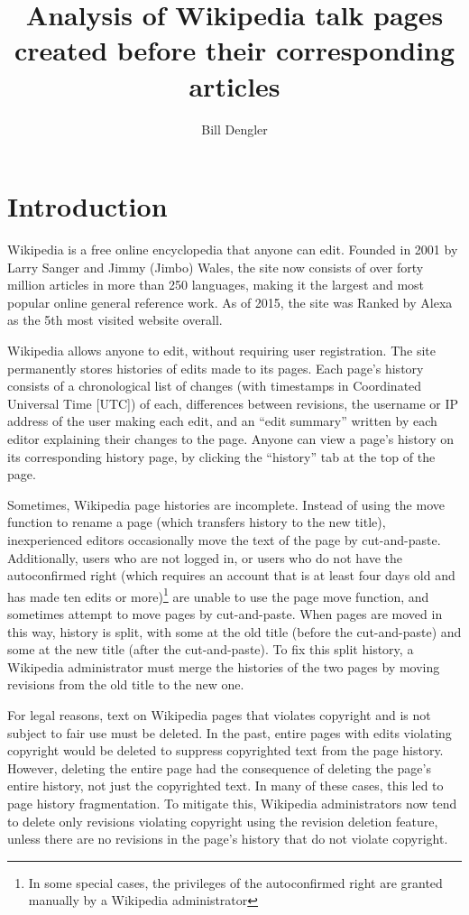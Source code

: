 \documentclass[14pt,a4paper]{report}
\title{Analysis of Wikipedia talk pages created before their corresponding articles}
\author{Bill Dengler}
\date{\parbox{\linewidth}{\centering%
  30th November 2017\endgraf\bigskip
  Subject: computer science\newline
  Research question: Why do some Wikipedia articles have their first visible edits to their talk pages occurring before those of the articles themselves?\newline
word count: 3525\newline
I declare that this work is my own work and is the final version.\newline I have acknowledged each of the words or ideas of another person, whether written, oral or visual.}}
\begin{document}
\maketitle
\tableofcontents
\newpage
\chapter{Introduction}
Wikipedia is a free online encyclopedia that anyone can edit. Founded in 2001 by Larry Sanger and Jimmy (Jimbo) Wales, the site now consists of over forty million articles in more than 250 languages, making it the largest and most popular online general reference work. As of 2015, the site was Ranked by Alexa as the 5th most visited website overall. \autocite{wikipedia}

Wikipedia allows anyone to edit, without requiring user registration. \autocite{register} The site permanently stores histories of edits made to its pages. Each page's history consists of a chronological list of changes (with timestamps in Coordinated Universal Time [UTC]) of each, differences between revisions, the username or IP address of the user making each edit, and an ``edit summary'' written by each editor explaining their changes to the page. Anyone can view a page's history on its corresponding history page, by clicking the ``history'' tab at the top of the page. \autocite{histhelp}

Sometimes, Wikipedia page histories are incomplete. Instead of using the move function to rename a page (which transfers history to the new title), inexperienced editors occasionally move the text of the page by cut-and-paste. \autocite{histhelp,move} Additionally, users who are not logged in, or users who do not have the autoconfirmed right (which requires an account that is at least four days old and has made ten edits or more)\footnote{In some special cases, the privileges of the autoconfirmed right are granted manually by a Wikipedia administrator\autocite{confirm}} are unable to use the page move function, and sometimes attempt to move pages by cut-and-paste. \autocite{move} When pages are moved in this way, history is split, with some at the old title (before the cut-and-paste) and some at the new title (after the cut-and-paste). To fix this split history, a Wikipedia administrator must merge the histories of the two pages by moving revisions from the old title to the new one. \autocite{historymerge}

For legal reasons, text on Wikipedia pages that violates copyright and is not subject to fair use must be deleted. In the past, entire pages with edits violating copyright would be deleted to suppress copyrighted text from the page history. However, deleting the entire page had the consequence of deleting the page's entire history, not just the copyrighted text. In many of these cases, this led to page history fragmentation. To mitigate this, Wikipedia administrators now tend to delete only revisions violating copyright using the revision deletion feature, unless there are no revisions in the page's history that do not violate copyright.
\end{document}
